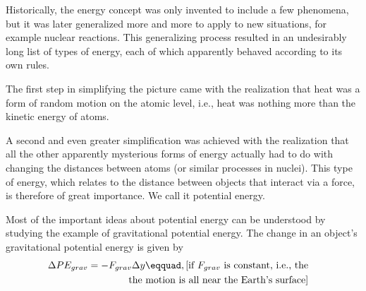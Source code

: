 \begin{summary}

\begin{vocab}


\end{vocab}

\begin{notation}


\end{notation}

\begin{othernotation}


\end{othernotation}

\begin{summarytext}

Historically, the energy concept was only invented to
include a few phenomena, but it was later generalized more
and more to apply to new situations, for example nuclear
reactions. This generalizing process resulted in an
undesirably long list of types of energy, each of which
apparently behaved according to its own rules.

The first step in simplifying the picture came with the
realization that heat was a form of random motion on the
atomic level, i.e., heat was nothing more than the kinetic energy of atoms.

A second and even greater simplification was achieved with
the realization that all the other apparently mysterious
forms of energy actually had to do with changing the
distances between atoms (or similar processes in nuclei).
This type of energy, which relates to the distance between
objects that interact via a force, is therefore of great
importance. We call it potential energy.

Most of the important ideas about potential energy can be
understood by studying the example of gravitational
potential energy. The change in an object's gravitational
potential energy is given by
\begin{multline*}
                \Delta PE_{grav}  =  -F_{grav} \Delta y\eqquad,
\hfill  \shoveright{\text{[if $F_{grav}$ is constant, i.e., the}}\\
\shoveright{\text{the motion is all near the Earth's surface]}}\\
\end{multline*}


\end{summarytext}
\end{summary}
